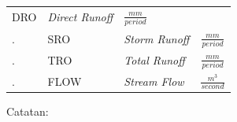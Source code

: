 \documentclass[11pt]{article}
\begin{document}
\begin{longtable}[]{@{}lllc@{}}
\begin{minipage}[t]{0.22\columnwidth}
DRO\strut
\end{minipage} & \begin{minipage}[t]{0.22\columnwidth}\raggedright
\emph{Direct Runoff}\strut
\end{minipage} & \begin{minipage}[t]{0.22\columnwidth}\centering
\(\frac{mm}{period}\)\strut
\end{minipage}\tabularnewline
\begin{minipage}[t]{0.22\columnwidth}\raggedright
.\strut
\end{minipage} & \begin{minipage}[t]{0.22\columnwidth}\raggedright
SRO\strut
\end{minipage} & \begin{minipage}[t]{0.22\columnwidth}\raggedright
\emph{Storm Runoff}\strut
\end{minipage} & \begin{minipage}[t]{0.22\columnwidth}\centering
\(\frac{mm}{period}\)\strut
\end{minipage}\tabularnewline
\begin{minipage}[t]{0.22\columnwidth}\raggedright
.\strut
\end{minipage} & \begin{minipage}[t]{0.22\columnwidth}\raggedright
TRO\strut
\end{minipage} & \begin{minipage}[t]{0.22\columnwidth}\raggedright
\emph{Total Runoff}\strut
\end{minipage} & \begin{minipage}[t]{0.22\columnwidth}\centering
\(\frac{mm}{period}\)\strut
\end{minipage}\tabularnewline
\begin{minipage}[t]{0.22\columnwidth}\raggedright
.\strut
\end{minipage} & \begin{minipage}[t]{0.22\columnwidth}\raggedright
FLOW\strut
\end{minipage} & \begin{minipage}[t]{0.22\columnwidth}\raggedright
\emph{Stream Flow}\strut
\end{minipage} & \begin{minipage}[t]{0.22\columnwidth}\centering
\(\frac{m^{3}}{second}\)\strut
\end{minipage}\tabularnewline
\bottomrule
\end{longtable}

Catatan:
\end{document}
